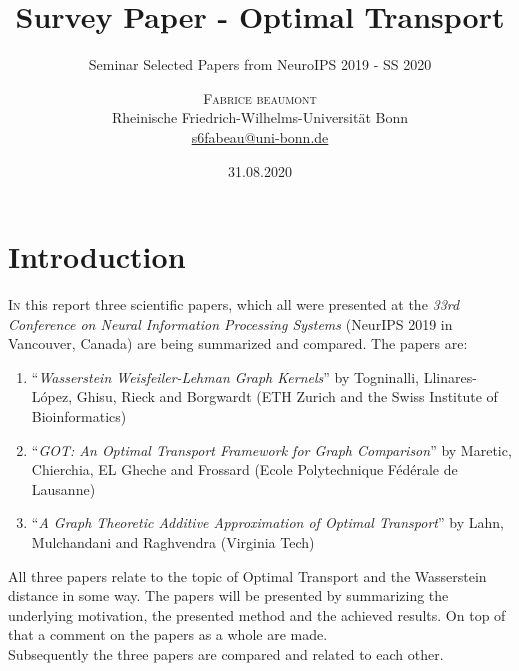 \documentclass[twoside]{scrartcl}
\title{Survey Paper - Optimal Transport}
\subtitle{Seminar Selected Papers from NeuroIPS 2019 - SS 2020}
\author{\textsc{Fabrice beaumont} \\[1ex] 
	\normalsize Rheinische Friedrich-Wilhelms-Universit\"at Bonn\\
	\normalsize \href{mailto:s6fabeau@uni-bonn.de}{s6fabeau@uni-bonn.de}  
}
\date{31.08.2020}
\begin{document}
\maketitle



\section{Introduction}

\lettrine[nindent=0em,lines=2]{I} n this report three scientific papers, which all were presented at the \textit{33rd Conference on Neural Information Processing Systems} (NeurIPS 2019 in Vancouver, Canada) are being summarized and compared. The papers are:\begin{enumerate}
	\item \enquote{\textit{Wasserstein Weisfeiler-Lehman Graph Kernels}} by Togninalli, Llinares-López, Ghisu, Rieck and Borgwardt (ETH Zurich and the Swiss Institute of Bioinformatics) \cite{A}
	\item \enquote{\textit{GOT: An Optimal Transport Framework for Graph Comparison}} by 
	 Maretic, Chierchia, EL Gheche and Frossard (Ecole Polytechnique Fédérale de Lausanne) \cite{B}
	\item \enquote{\textit{A Graph Theoretic Additive Approximation of Optimal Transport}}
	by Lahn, Mulchandani and Raghvendra (Virginia Tech)
	\cite{C}
\end{enumerate}

All three papers relate to the topic of Optimal Transport and the Wasserstein distance in some way. The papers will be presented by summarizing the underlying motivation, the presented method and the achieved results. On top of that a comment on the papers as a whole are made.\\
Subsequently the three papers are compared and related to each other.\\
\end{document}
